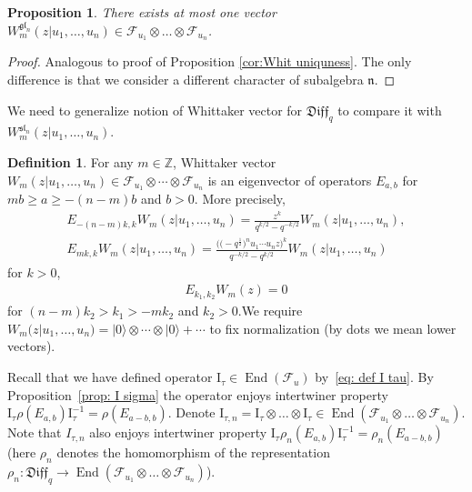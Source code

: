 \documentclass[pdftex]{sigma}
\numberwithin{equation}{section}
\newtheorem{Proposition}[Theorem]{Proposition}
\theoremstyle{definition}
\newtheorem{Definition}[Theorem]{Definition}
\newcommand{\half}{\frac{1}{2}}
\newcommand{\vac}{|0 \rangle}
\newcommand{\qD}{\mathfrak{Diff}_q}
\DeclareMathOperator{\End}{End}
\newcommand{\I}{\mathrm{I}}
\begin{document}
\begin{Proposition} \label{prop: unique for m gl}
There exists at most one vector $W_m^{\mathfrak{gl}_n}(z| u_1, \dots, u_n) \in \mathcal{F}_{u_1} \otimes \dots \otimes \mathcal{F}_{u_n}$.
\end{Proposition}

\begin{proof}Analogous to proof of Proposition \ref{cor:Whit uniquness}. The only difference is that we consider a different character of subalgebra $\mathfrak{n}$.
\end{proof}

We need to generalize notion of Whittaker vector for $\qD$ to compare it with $W_m^{\mathfrak{sl}_n}(z| u_1,\allowbreak \dots, u_n)$.

\begin{Definition}For any $m \in \mathbb{Z}$, Whittaker vector $W_m (z|u_1, \dots, u_n) \in \mathcal{F}_{u_1} \otimes \cdots \otimes \mathcal{F}_{u_n}$ is an eigenvector of operators $E_{a,b}$ for $mb \geqslant a \geqslant -(n-m)b$ and $b > 0$. More precisely,
\begin{gather*}
E_{-(n-m)k,k}  W_m (z|u_1, \dots, u_n) = \frac{z^k}{q^{k/2}-q^{-k/2}} W_m (z|u_1, \dots, u_n), \\ %
E_{mk,k}  W_m (z|u_1, \dots, u_n) = \frac{\big(\big( {-}q^{\half} \big)^nu_1 \cdots u_n z\big)^{k}}{q^{-k/2}-q^{k/2}} W_m(z|u_1, \dots, u_n) %
\end{gather*}
for $k>0$,
\begin{gather*}
E_{k_1, k_2} W_m(z) =0
\end{gather*}
for $(n-m)k_2 > k_1 > -mk_2$ and $k_2 > 0$.We require $W_m(z|u_1, \dots, u_n) = \vac \otimes \cdots \otimes \vac + \cdots$ to fix normalization (by dots we mean lower vectors).
\end{Definition}

Recall that we have defined operator $\I_{\tau} \in \End(\mathcal{F}_{u})$ by~\eqref{eq: def I tau}. By Proposition~\ref{prop: I sigma} the operator enjoys intertwiner property $\I_{\tau} \rho(E_{a,b}) \I_{\tau}^{-1} = \rho(E_{a-b,b})$. Denote $\I_{\tau, n} = \I_{\tau} \otimes \dots \otimes \I_{\tau} \in \End(\mathcal{F}_{u_1} \otimes \dots \otimes \mathcal{F}_{u_n})$. Note that $I_{\tau, n}$ also enjoys intertwiner property $\I_{\tau} \rho_n(E_{a,b}) \I_{\tau}^{-1} = \rho_n(E_{a-b,b})$ (here $\rho_n$ denotes the homomorphism of the representation $\rho_n \colon \qD \rightarrow \End(\mathcal{F}_{u_1} \otimes \dots \otimes \mathcal{F}_{u_n}) $).
\end{document}
